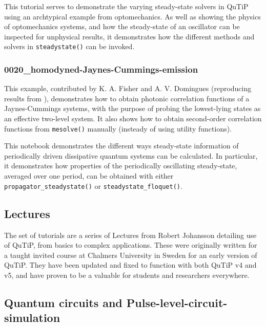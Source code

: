 \documentclass[preprint,3p,sort&compress]{elsarticle}
\def\code#1{\texttt{#1}}
\newcommand{\nocontentsline}[3]{}
\newcommand{\tocless}[2]{\bgroup\let\addcontentsline=\nocontentsline#1{#2}\egroup}
\begin{document}
This tutorial serves to demonstrate the varying steady-state solvers in QuTiP using an archtypical example from optomechanics.  As well as showing the physics of optomechanics systems, and how the steady-state of an oscillator can be inspected for unphysical results, it demonstrates how the different methods and solvers in \code{steadystate()} can be invoked.\newline

\tocless\subsubsection{0020\_homodyned-Jaynes-Cummings-emission}

This example, contributed by K. A. Fisher and A. V. Domingues (reproducing results from \cite{PhysRevApplied.7.044002}), demonstrates how to obtain photonic correlation functions of a Jaynes-Cummings systems, with the purpose of probing the lowest-lying states as an effective two-level system. It also shows how to obtain second-order correlation functions from \code{mesolve()} manually (insteady of using utility functions).\newline

\tocless\subsubsection{0021\_quasi-steadystate-driven-system}

This notebook demonstrates the different ways steady-state information of periodically driven dissipative quantum systems can be calculated.  In particular, it demonstrates how properties of the periodically oscillating steady-state, averaged over one period, can be obtained with either \code{propagator\_steadystate()} or \code{steadystate\_floquet()}.

\subsection{Lectures}

The set of tutorials are a series of Lectures from Robert Johansson detailing use of QuTiP, from basics to complex applications. These were originally written for a taught invited course at Chalmers University in Sweden for an early version of QuTiP.  They have been updated and fixed to function with both QuTiP v4 and v5, and have proven to be a valuable for students and researchers everywhere. 


\subsection{Quantum circuits and Pulse-level-circuit-simulation}
\end{document}
